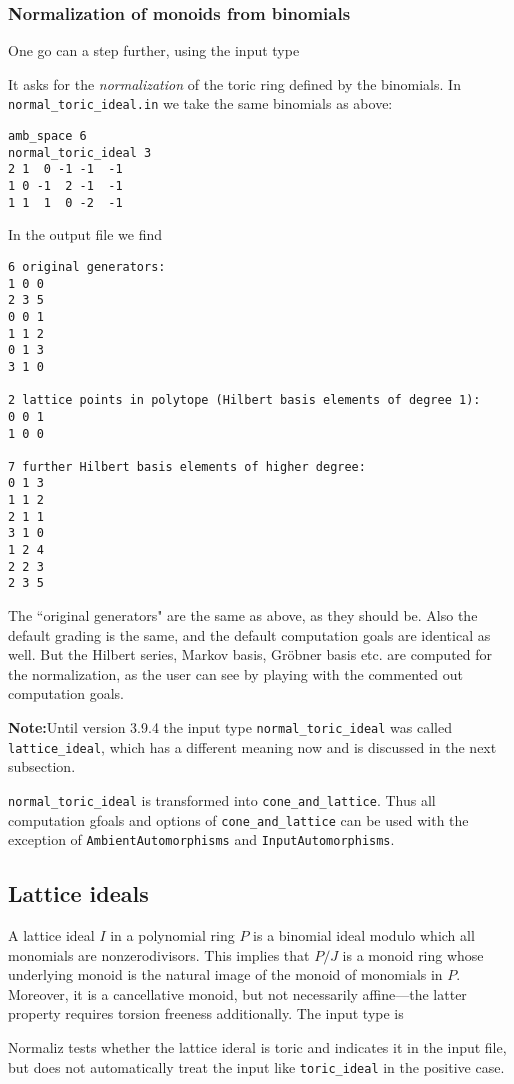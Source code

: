 \subsubsection{Normalization of monoids from binomials}\label{normal_toric_ideal}

One go can a step further, using the input type
\begin{itemize}
\end{itemize}
It asks for the \emph{normalization} of the toric ring defined by the binomials. In \verb|normal_toric_ideal.in| we take the same binomials  as above:
\begin{Verbatim}
amb_space 6
normal_toric_ideal 3
2 1  0 -1 -1  -1
1 0 -1  2 -1  -1
1 1  1  0 -2  -1
\end{Verbatim}
In the output file we find
\begin{Verbatim}
6 original generators:
1 0 0
2 3 5
0 0 1
1 1 2
0 1 3
3 1 0

2 lattice points in polytope (Hilbert basis elements of degree 1):
0 0 1
1 0 0

7 further Hilbert basis elements of higher degree:
0 1 3
1 1 2
2 1 1
3 1 0
1 2 4
2 2 3
2 3 5
\end{Verbatim}
The ``original generators" are the same as above, as they should be. Also the default grading is the same, and the default computation goals are identical as well. But the Hilbert series, Markov basis, Gröbner basis etc. are computed for the normalization, as the user can see by playing with the commented out computation goals.

\textbf{Note:}\enspace Until version 3.9.4 the input type \verb|normal_toric_ideal| was called \verb|lattice_ideal|, which has a different meaning now and is discussed in the next subsection.

\verb|normal_toric_ideal| is transformed into \verb|cone_and_lattice|. Thus all computation gfoals and options of \verb|cone_and_lattice| can be used with the exception of \verb|AmbientAutomorphisms| and \verb|InputAutomorphisms|.

\subsection{Lattice ideals}\label{lattice_ideal}

A lattice ideal $I$ in a polynomial ring $P$ is a binomial ideal modulo which all monomials are nonzerodivisors. This implies that $P/J$ is a monoid ring whose underlying monoid is the natural image of the monoid of monomials in $P$. Moreover, it is a cancellative monoid, but not necessarily affine---the latter property requires torsion freeness additionally. The input type is
\begin{itemize}
\end{itemize}
Normaliz tests whether the lattice ideral is toric and indicates it in the input file, but does not automatically treat the input like \verb|toric_ideal| in the positive case.

